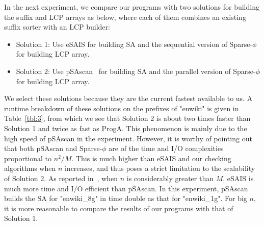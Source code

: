 \documentclass[10pt,journal,compsoc]{IEEEtran}
\begin{document}

In the next experiment, we compare our programs with two solutions for building the suffix and LCP arrays as below, where each of them combines an existing suffix sorter with an LCP builder:


\begin{itemize}
	\item Solution 1: Use eSAIS for building SA and the sequential version of Sparse-$\phi$~\cite{Karkkainen2016} for building LCP array.
	
	\item Solution 2: Use pSAscan~\cite{Karkkainen2015} for building SA and the parallel version of Sparse-$\phi$ for building LCP array.
\end{itemize}


We select these solutions because they are the current fastest available to us. A runtime breakdown of these solutions on the prefixes of "enwiki" is given in Table~\ref{tbl:3}, from which we see that Solution 2 is about two times faster than Solution 1 and twice as fast as ProgA. This phenomenon is mainly due to the high speed of pSAscan in the experiment. However, it is worthy of pointing out that both pSAscan and Sparse-$\phi$ are of the time and I/O complexities proportional to $n^2/M$. This is much higher than eSAIS and our checking algorithms when $n$ increases, and thus poses a strict limitation to the scalability of Solution 2. As reported in~\cite{Karkkainen2015}, when $n$ is considerably greater than $M$, eSAIS is much more time and I/O efficient than pSAscan. In this experiment, pSAscan builds the SA for "enwiki\_8g" in time double as that for "enwiki\_1g". For big $n$, it is more reasonable to compare the results of our programs with that of Solution 1.
\end{document}
